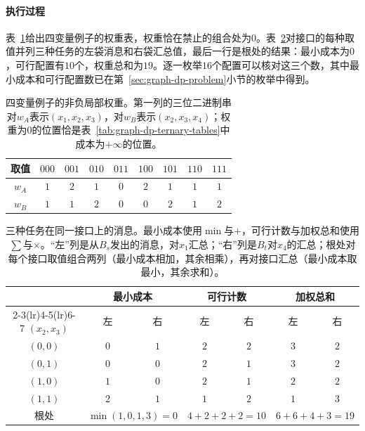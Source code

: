 \paragraph{执行过程}
表~\ref{tab:graph-dp-weights}给出四变量例子的权重表，权重恰在禁止的组合处为$0$。表~\ref{tab:graph-dp-three-aggregations}对接口的每种取值并列三种任务的左袋消息和右袋汇总值，最后一行是根处的结果：最小成本为$0$，可行配置有$10$个，权重总和为$19$。逐一枚举$16$个配置可以核对这三个数，其中最小成本和可行配置数已在第~\ref{sec:graph-dp-problem}小节的枚举中得到。

\begin{table}[!htb]
  \centering
  \caption{四变量例子的非负局部权重。第一列的三位二进制串对$w_A$表示$(x_1,x_2,x_3)$，对$w_B$表示$(x_2,x_3,x_4)$；权重为$0$的位置恰是表~\ref{tab:graph-dp-ternary-tables}中成本为$+\infty$的位置。}
  \label{tab:graph-dp-weights}
  \begin{tabular}{ccccccccc}
    \toprule
    取值 & $000$ & $001$ & $010$ & $011$ & $100$ & $101$ & $110$ & $111$\\
    \midrule
    $w_A$ & $1$ & $2$ & $1$ & $0$ & $2$ & $1$ & $1$ & $1$\\
    $w_B$ & $1$ & $1$ & $2$ & $0$ & $0$ & $2$ & $1$ & $2$\\
    \bottomrule
  \end{tabular}
\end{table}

\begin{table}[!htb]
  \centering
  \caption{三种任务在同一接口上的消息。最小成本使用$\min$与$+$，可行计数与加权总和使用$\sum$与$\times$。“左”列是从$B_s$发出的消息，对$x_1$汇总；“右”列是$B_t$对$x_4$的汇总；根处对每个接口取值组合两列（最小成本相加，其余相乘），再对接口汇总（最小成本取最小，其余求和）。}
  \label{tab:graph-dp-three-aggregations}
  \begin{tabular}{ccccccc}
    \toprule
    & \multicolumn{2}{c}{最小成本} & \multicolumn{2}{c}{可行计数} & \multicolumn{2}{c}{加权总和}\\
    \cmidrule(lr){2-3}\cmidrule(lr){4-5}\cmidrule(lr){6-7}
    $(x_2,x_3)$ & 左 & 右 & 左 & 右 & 左 & 右\\
    \midrule
    $(0,0)$ & $0$ & $1$ & $2$ & $2$ & $3$ & $2$\\
    $(0,1)$ & $0$ & $0$ & $2$ & $1$ & $3$ & $2$\\
    $(1,0)$ & $1$ & $0$ & $2$ & $1$ & $2$ & $2$\\
    $(1,1)$ & $2$ & $1$ & $1$ & $2$ & $1$ & $3$\\
    \midrule
    根处 & \multicolumn{2}{c}{$\min(1,0,1,3)=0$} & \multicolumn{2}{c}{$4+2+2+2=10$} & \multicolumn{2}{c}{$6+6+4+3=19$}\\
    \bottomrule
  \end{tabular}
\end{table}

